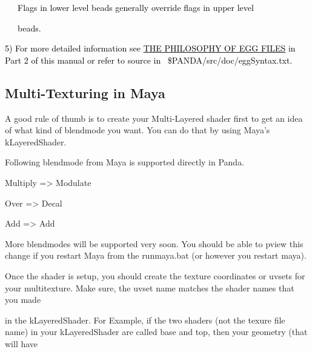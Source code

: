 \documentclass[a4paper]{article}
\newcommand\textstyleOOoComputerKeyWord[1]{\textrm{\textcolor[rgb]{0.0,0.0,0.5019608}{#1}}}
\begin{document}
\bigskip

{\color{black}
\textstyleOOoComputerKeyWord{\textcolor{black}{\ \ \ Flags in lower level beads generally override flags in upper
level}}}

{\color{black}
\textstyleOOoComputerKeyWord{\textcolor{black}{\ \ \ beads. }}}


\bigskip

{\color{black}
\textstyleOOoComputerKeyWord{\textcolor{black}{5) For more detailed information see
}}\hyperlink{RefHeading7670869075401}{\textstyleOOoComputerKeyWord{\textcolor{black}{THE PHILOSOPHY OF EGG
FILES}}}\textstyleOOoComputerKeyWord{\textcolor{black}{ in Part 2 of this manual or refer to source in
\ \$PANDA/src/doc/eggSyntax.txt.}}}

\clearpage\subsection[Multi{}-Texturing in Maya]{Multi-Texturing in Maya}
\hypertarget{RefHeading312261927442421}{}
\bigskip

{\color{black}
A good rule of thumb is to create your Multi-Layered shader first to get an idea of what kind of blendmode you want. You
can do that by using Maya's kLayeredShader.}


\bigskip

{\color{black}
Following blendmode from Maya is supported directly in Panda.}


\bigskip

{\color{black}
{\textquotedbl}Multiply{\textquotedbl} ={\textgreater} {\textquotedbl}Modulate{\textquotedbl}}

{\color{black}
{\textquotedbl}Over{\textquotedbl} ={\textgreater} {\textquotedbl}Decal{\textquotedbl}}

{\color{black}
{\textquotedbl}Add{\textquotedbl} ={\textgreater} {\textquotedbl}Add{\textquotedbl}}


\bigskip

{\color{black}
More blendmodes will be supported very soon. You should be able to pview this change if you restart Maya from the
{\textquotedbl}runmaya.bat{\textquotedbl} (or however you restart maya).}


\bigskip

{\color{black}
Once the shader is setup, you should create the texture coordinates or uvsets for your multitexture. Make sure, the
uvset name matches the shader names that you made}

{\color{black}
in the kLayeredShader. For Example, if the two shaders (not the texure file name) in your kLayeredShader are called
{\textquotedbl}base{\textquotedbl} and {\textquotedbl}top{\textquotedbl}, then your geometry (that will have}
\end{document}
